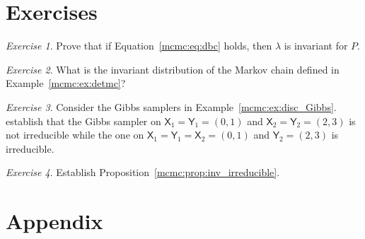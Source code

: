 \documentclass[12pt]{article}
\theoremstyle{plain}
\theoremstyle{definition}
\theoremstyle{remark}
\newtheorem{hw}{Exercise}[section]
\newcommand{\X}{\mathsf{X}}
\newcommand{\Y}{\mathsf{Y}}
\begin{document}
\section*{Exercises}
\begin{hw}
  \label{mcmc:hw:dbc}
Prove that if Equation~\ref{mcmc:eq:dbc} holds, then $\lambda$ is
invariant for $P$.
\end{hw}

\begin{hw}
What is the invariant distribution of the Markov chain defined in
Example~\ref{mcmc:ex:detmc}?
\end{hw}

\begin{hw}
  Consider the Gibbs samplers in Example~\ref{mcmc:ex:disc_Gibbs}.
  establish that the Gibbs sampler on $\X_1 = \Y_1 = (0,1)$ and
  $\X_2 = \Y_2 = (2,3)$ is not irreducible while the one on
  $\X_1 = \Y_1 = \X_2 = (0,1)$ and $ \Y_2 = (2,3)$ is irreducible.
\end{hw}

\begin{hw}
Establish Proposition~\ref{mcmc:prop:inv_irreducible}.
\end{hw}



\newpage

\section*{Appendix}





\end{document}

